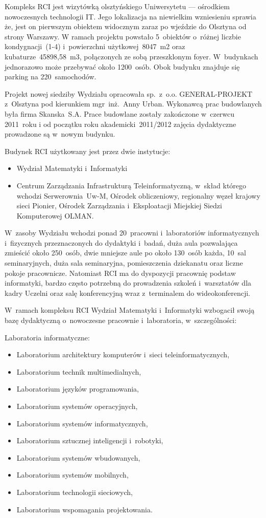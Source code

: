 \documentclass[a4paper,12pt]{article}
\begin{document}
Kompleks RCI jest wizytówką olsztyńskiego Uniwersytetu --- ośrodkiem nowoczesnych technologii IT. Jego lokalizacja na niewielkim wzniesieniu sprawia że, jest on pierwszym obiektem widocznym zaraz po wjeździe do Olsztyna od strony Warszawy. W ramach projektu powstało 5~obiektów o~różnej liczbie kondygnacji~(1-4) i~powierzchni użytkowej~8047~m2 oraz kubaturze~45898,58~m3, połączonych ze sobą przeszklonym foyer. W~budynkach jednorazowo może przebywać około 1200~osób. Obok budynku znajduje się parking na 220~samochodów.

Projekt nowej siedziby Wydziału opracowała sp.~z~o.o. GENERAL-PROJEKT z~Olsztyna pod kierunkiem mgr~inż.~Anny Urban. Wykonawcą prac budowlanych była firma Skanska~S.A. Prace budowlane zostały
zakończone w~czerwcu 2011~roku i od początku roku akademicki~2011/2012 zajęcia dydaktyczne prowadzone są w~nowym budynku.

Budynek RCI użytkowany jest przez dwie instytucje:
\begin{itemize}
\item{Wydział Matematyki i~Informatyki}
\item{Centrum Zarządzania Infrastrukturą Teleinformatyczną, w~skład którego wchodzi Serwerownia~Uw-M, Ośrodek obliczeniowy, regionalny węzeł krajowy sieci Pionier, Ośrodek Zarządzania i~Eksploatacji Miejskiej Siedzi Komputerowej OLMAN.}
\end{itemize}

W~zasoby Wydziału wchodzi ponad 20~pracowni i~laboratoriów informatycznych i~fizycznych przeznaczonych do dydaktyki i~badań, duża aula pozwalająca zmieścić około 250~osób, dwie mniejsze aule po około 130~osób każda, 10~sal seminaryjnych, duża sala seminaryjna, pomieszczenia dziekanatu oraz liczne pokoje pracownicze. Natomiast RCI ma do dyspozycji pracownię podstaw informatyki, bardzo często potrzebną do prowadzenia szkoleń i~warsztatów dla kadry Uczelni oraz salę konferencyjną wraz z~terminalem do wideokonferencji.

W~ramach kompleksu RCI Wydział Matematyki i~Informatyki wzbogacił swoją bazę dydaktyczną o~nowoczesne pracownie i~laboratoria, w~szczególności:

Laboratoria informatyczne:
\begin{itemize}
\item{Laboratorium architektury komputerów i~sieci teleinformatycznych,}
\item{Laboratorium technik multimedialnych,}
\item{Laboratorium języków programowania,}
\item{Laboratorium systemów operacyjnych,}
\item{Laboratorium systemów informatycznych,}
\item{Laboratorium sztucznej inteligencji i~robotyki,}
\item{Laboratorium systemów wbudowanych,}
\item{Laboratorium systemów mobilnych,}
\item{Laboratorium technologii sieciowych,}
\item{Laboratorium wspomagania projektowania.}
\end{itemize}
\end{document}
